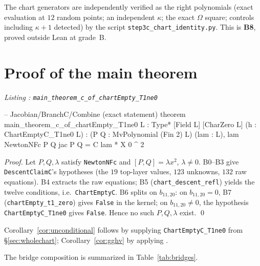 \documentclass[a4paper,11pt]{article}
\newcounter{leanlisting}
\newenvironment{leanlisting}[2]{%
  \refstepcounter{leanlisting}\label{#2}%
  \begin{center}\textit{\small Listing \theleanlisting: #1}\end{center}%
  \Verbatim[breaklines=true,breakanywhere=true,fontsize=\footnotesize,frame=single,framesep=4pt,rulecolor=\color{gray!50},fillcolor=\color{gray!5}]%
}{%
  \endVerbatim%
}
\theoremstyle{plain}
\theoremstyle{definition}
\theoremstyle{remark}
\begin{document}
The chart generators are independently verified as the right polynomials (exact evaluation at $12$ random points; an independent $\kappa$; the exact $\Omega$ square; controls including $\kappa+1$ detected) by the script \texttt{step3c\_chart\_identity.py}. This is \textbf{B8}, proved outside Lean at grade~B.

\section{Proof of the main theorem}\label{sec:proof}

\begin{leanlisting}{\texttt{main\_theorem\_c\_of\_chartEmpty\_T1ne0}}{lst:main}
-- Jacobian/BranchC/Combine (exact statement)
theorem main_theorem_c_of_chartEmpty_T1ne0
    {L : Type*} [Field L] [CharZero L]
    (h : ChartEmptyC_T1ne0 L) :
    \lnot \exists (P Q : MvPolynomial (Fin 2) L) (lam : L),
      lam  \land NewtonNFc P Q \land jac P Q = C lam * X 0 ^ 2
\end{leanlisting}

\emph{Proof.} Let $P,Q,\lambda$ satisfy \texttt{NewtonNFc} and $[P,Q]=\lambda x^2$, $\lambda\ne0$. B0--B3 give \texttt{DescentClaimC}'s hypotheses (the $19$ top-layer values, $123$ unknowns, $132$ raw equations). B4 extracts the raw equations; B5 (\texttt{chart\_descent\_refl}) yields the twelve conditions, i.e.\ \texttt{ChartEmptyC}. B6 splits on $b_{11,20}$: on $b_{11,20}=0$, B7 (\texttt{chartEmpty\_t1\_zero}) gives \texttt{False} in the kernel; on $b_{11,20}\ne0$, the hypothesis \texttt{ChartEmptyC\_T1ne0} gives \texttt{False}. Hence no such $P,Q,\lambda$ exist. \qed

Corollary~\ref{cor:unconditional} follows by supplying \texttt{ChartEmptyC\_T1ne0} from \S\ref{sec:wholechart}; Corollary~\ref{cor:gghv} by applying \cite[Proposition~4.3]{GGHV}.

The bridge composition is summarized in Table~\ref{tab:bridges}.
\end{document}
